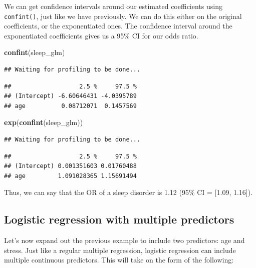 \documentclass[
]{book}
\newenvironment{Shaded}{\begin{snugshade}}{\end{snugshade}}
\newcommand{\FunctionTok}[1]{\textcolor[rgb]{0.13,0.29,0.53}{\textbf{#1}}}
\newcommand{\NormalTok}[1]{#1}
\begin{document}
We can get confidence intervals around our estimated coefficients using \texttt{confint()}, just like we have previously. We can do this either on the original coefficients, or the exponentiated ones. The confidence interval around the exponentiated coefficients gives us a 95\% CI for our odds ratio.

\begin{Shaded}
\begin{Highlighting}[]
\FunctionTok{confint}\NormalTok{(sleep\_glm)}
\end{Highlighting}
\end{Shaded}

\begin{verbatim}
## Waiting for profiling to be done...
\end{verbatim}

\begin{verbatim}
##                   2.5 %     97.5 %
## (Intercept) -6.60646431 -4.0395789
## age          0.08712071  0.1457569
\end{verbatim}

\begin{Shaded}
\begin{Highlighting}[]
\FunctionTok{exp}\NormalTok{(}\FunctionTok{confint}\NormalTok{(sleep\_glm))}
\end{Highlighting}
\end{Shaded}

\begin{verbatim}
## Waiting for profiling to be done...
\end{verbatim}

\begin{verbatim}
##                   2.5 %     97.5 %
## (Intercept) 0.001351603 0.01760488
## age         1.091028365 1.15691494
\end{verbatim}

Thus, we can say that the OR of a sleep disorder is 1.12 (95\% CI = {[}1.09, 1.16{]}).

\subsection{Logistic regression with multiple predictors}\label{logistic-regression-with-multiple-predictors}

Let's now expand out the previous example to include two predictors: age and stress. Just like a regular multiple regression, logistic regression can include multiple continuous predictors. This will take on the form of the following:
\end{document}
